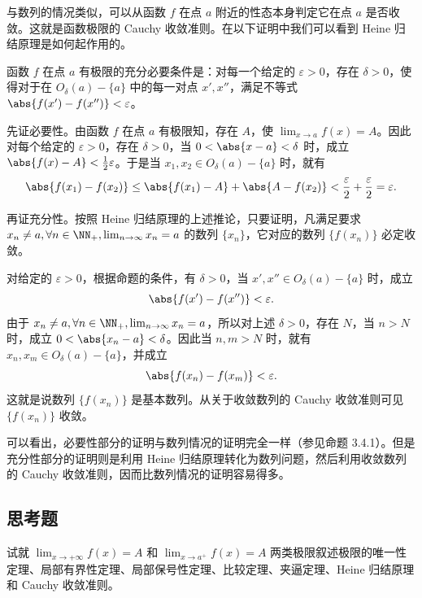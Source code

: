 与数列的情况类似，可以从函数 $f$ 在点 $a$ 附近的性态本身判定它在点 $a$ 是否收敛。这就是函数极限的 Cauchy 收敛准则。在以下证明中我们可以看到 Heine 归结原理是如何起作用的。

\begin{xproposition}
函数 $f$ 在点 $a$ 有极限的充分必要条件是：对每一个给定的 $\varepsilon>0$，存在 $\delta>0$，使得对于在 $O_\delta(a)-\{a\}$ 中的每一对点 $x',x''$，满足不等式 $\abs{f(x')-f(x'')}<\varepsilon$。
\end{xproposition}
\begin{xproof}
先证必要性。由函数 $f$ 在点 $a$ 有极限知，存在 $A$，使 $\lim_{x\to a}f(x)=A$。因此对每个给定的 $\varepsilon>0$，存在 $\delta>0$，当 $0<\abs{x-a}<\delta$ 时，成立 $\abs{f(x)-A}<\frac12\varepsilon$。于是当 $x_1,x_2\in O_\delta(a)-\{a\}$ 时，就有
\[
  \abs{f(x_1)-f(x_2)}\leq\abs{f(x_1)-A}+\abs{A-f(x_2)}<\frac\varepsilon2+\frac\varepsilon2=\varepsilon.
\]

再证充分性。按照 Heine 归结原理的上述推论，只要证明，凡满足要求 $x_n\ne a,\forall n\in\NN_+,\lim_{n\to\infty}x_n=a$ 的数列 $\{x_n\}$，它对应的数列 $\{f(x_n)\}$ 必定收敛。

对给定的 $\varepsilon>0$，根据命题的条件，有 $\delta>0$，当 $x',x''\in O_\delta(a)-\{a\}$ 时，成立
\[
  \abs{f(x')-f(x'')}<\varepsilon.
\]
由于 $x_n\ne a,\forall n\in\NN_+,\lim_{n\to\infty}x_n=a$，所以对上述 $\delta>0$，存在 $N$，当 $n>N$ 时，成立 $0<\abs{x_n-a}<\delta$。因此当 $n,m>N$ 时，就有 $x_n,x_m\in O_\delta(a)-\{a\}$，并成立
\[
  \abs{f(x_n)-f(x_m)}<\varepsilon.
\]
这就是说数列 $\{f(x_n)\}$ 是基本数列。从关于收敛数列的 Cauchy 收敛准则可见 $\{f(x_n)\}$ 收敛。
\end{xproof}

\begin{xremark}
可以看出，必要性部分的证明与数列情况的证明完全一样（参见命题 3.4.1）。但是充分性部分的证明则是利用 Heine 归结原理转化为数列问题，然后利用收敛数列的 Cauchy 收敛准则，因而比数列情况的证明容易得多。
\end{xremark}

\subsection{思考题}

\begin{xthought}[1]
试就 $\lim_{x\to+\infty}f(x)=A$ 和 $\lim_{x\to a^+}f(x)=A$ 两类极限叙述极限的唯一性定理、局部有界性定理、局部保号性定理、比较定理、夹逼定理、Heine 归结原理和 Cauchy 收敛准则。
\end{xthought}

